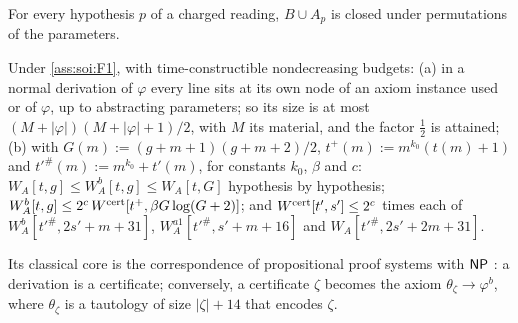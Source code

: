 \begin{assumption}\label{ass:soi:F1}
For every hypothesis $p$ of a charged reading, $B\cup A_p$ is closed under permutations of the parameters.
\end{assumption}

\begin{theorem}\label{thm:soi:sandwich}
Under \cref{ass:soi:F1}, with time-constructible nondecreasing budgets:
(a) in a normal derivation of $\varphi$ every line sits at its own node of an axiom instance used or of $\varphi$, up to abstracting parameters; so its size is at most $(M+\lvert\varphi\rvert)(M+\lvert\varphi\rvert+1)/2$, with $M$ its material, and the factor $\frac12$ is attained;
(b) with $G(m):=(g+m+1)(g+m+2)/2$, $t^+(m):=m^{k_0}(t(m)+1)$ and $t'^\#(m):=m^{k_0}+t'(m)$, for constants $k_0$, $\beta$ and $c$: $W_A[t,g]\le W_A^b[t,g]\le W_A[t,G]$ hypothesis by hypothesis; $W_A^b[t,g]\le2^c\,W^{\mathrm{cert}}[t^+,\beta G\log(G+2)]$; and $W^{\mathrm{cert}}[t',s']\le2^c$ times each of $W_A^b[t'^\#,2s'+m+31]$, $W_A^{a1}[t'^\#,s'+m+16]$ and $W_A[t'^\#,2s'+2m+31]$.
\end{theorem}

Its classical core is the correspondence of propositional proof systems with $\mathsf{NP}$ \citep{cook1979relative}: a derivation is a certificate; conversely, a certificate $\zeta$ becomes the axiom $\theta_\zeta\to\varphi^b$, where $\theta_\zeta$ is a tautology of size $\lvert\zeta\rvert+14$ that encodes $\zeta$.

